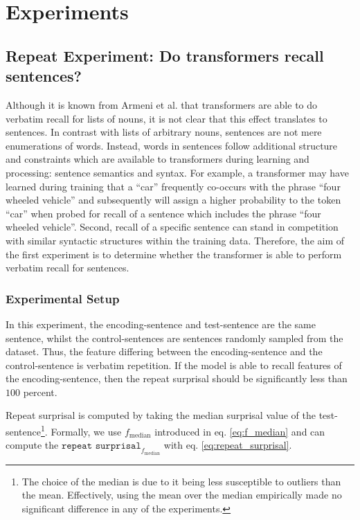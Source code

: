 \section{Experiments}

\subsection{Repeat Experiment: Do transformers recall sentences?} \label{ex:1_repeat}

Although it is known from Armeni et al. that transformers are able to do verbatim recall for lists of nouns, it is not clear that this effect translates to sentences.
In contrast with lists of arbitrary nouns, sentences are not mere enumerations of words. Instead, words in sentences follow additional structure and constraints which are available to transformers during learning and processing: sentence semantics and syntax.
For example, a transformer may have learned during training that a ``car'' frequently co-occurs with the phrase ``four wheeled vehicle'' and subsequently will assign a higher probability to the token ``car'' when probed for recall of a sentence which includes the phrase ``four wheeled vehicle''.
Second, recall of a specific sentence can stand in competition with similar syntactic structures within the training data.
Therefore, the aim of the first experiment is to determine whether the transformer is able to perform verbatim recall for sentences.

\subsubsection{Experimental Setup}
In this experiment, the encoding-sentence and test-sentence are the same sentence, whilst the control-sentences are sentences randomly sampled from the dataset.
Thus, the feature differing between the encoding-sentence and the control-sentence is verbatim repetition.
If the model is able to recall features of the encoding-sentence, then the repeat surprisal should be significantly less than $100$ percent.

Repeat surprisal is computed by taking the median surprisal value of the test-sentence\footnote{The choice of the median is due to it being less susceptible to outliers than the mean. Effectively, using the mean over the median empirically made no significant difference in any of the experiments.}.
\sloppy Formally, we use $f_\text{median}$ introduced in eq. \ref{eq:f_median} and can compute the $\texttt{repeat surprisal}_{f_\text{median}}$ with eq. \ref{eq:repeat_surprisal}.

